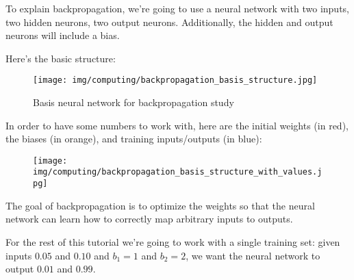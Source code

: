 	To explain backpropagation, we're going to use a neural network with two inputs, two hidden neurons, two output neurons. Additionally, the hidden and output neurons will include a bias.

	Here's the basic structure:
	\begin{figure}[H]
		\centering
		\texttt{[image: img/computing/backpropagation\_basis\_structure.jpg]}
		\caption[]{Basis neural network for backpropagation study}
	\end{figure}
	In order to have some numbers to work with, here are the initial weights (in red), the biases (in orange), and training inputs/outputs (in blue):
	\begin{figure}[H]
		\centering
		\texttt{[image: img/computing/backpropagation\_basis\_structure\_with\_values.jpg]}
	\end{figure}
	The goal of backpropagation is to optimize the weights so that the neural network can learn how to correctly map arbitrary inputs to outputs.

	For the rest of this tutorial we're going to work with a single training set: given inputs $0.05$ and $0.10$ and $b_1=1$ and $b_2=2$, we want the neural network to output $0.01$ and $0.99$.
	
